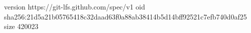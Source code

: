 version https://git-lfs.github.com/spec/v1
oid sha256:21d5a21b05765418c32daad63f0a88ab38414b5d14bff92521c7efb740d0af25
size 420023
